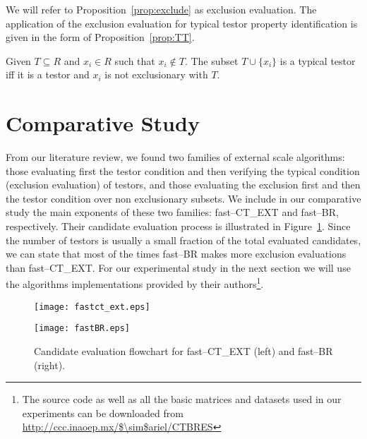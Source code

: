 \documentclass[citeauthoryear]{llncs}
\begin{document}
	We will refer to Proposition~\ref{prop:exclude} as exclusion evaluation. The application of the exclusion evaluation for typical testor property identification is given in the form of Proposition~\ref{prop:TT}.
	
	\begin{proposition}\label{prop:TT} 
			Given $T \subseteq R$ and $x_i \in R$ such that $x_i \notin T$. The subset $T \cup \lbrace x_i\rbrace$ is a typical testor iff it is a testor and $x_i$ is not exclusionary with $T$.
	\end{proposition}
		
%
\section{Comparative Study}
%
	  From our literature review, we found two families of external scale algorithms: those evaluating first the testor condition and then verifying the typical condition (exclusion evaluation) of testors, and those evaluating the exclusion first and then the testor condition over non exclusionary subsets. We include in our comparative study the main exponents of these two families: fast--CT\_EXT and fast--BR, respectively. Their candidate evaluation process is illustrated in Figure~\ref{fig:candeval}.  Since the number of testors is usually a small fraction of the total evaluated candidates, we can state that most of the times fast--BR makes more exclusion evaluations than fast--CT\_EXT. For our experimental study in the next section we will use the algorithms implementations provided by their authors\footnote{The source code as well as all the basic matrices and datasets used in our experiments can be downloaded from \url{http://ccc.inaoep.mx/$\sim$ariel/CTBRES}}.
	
	\begin{figure}[htb]
	    \centering
	    \begin{minipage}{.5\textwidth}
	        \centering
	        \texttt{[image: fastct\_ext.eps]}
	    \end{minipage}%
	    \begin{minipage}{0.5\textwidth}
	        \centering
	        \texttt{[image: fastBR.eps]}	        
	    \end{minipage}
		\caption{Candidate evaluation flowchart for fast--CT\_EXT (left) and fast--BR (right).}
		\label{fig:candeval}
	\end{figure}

	
\end{document}
